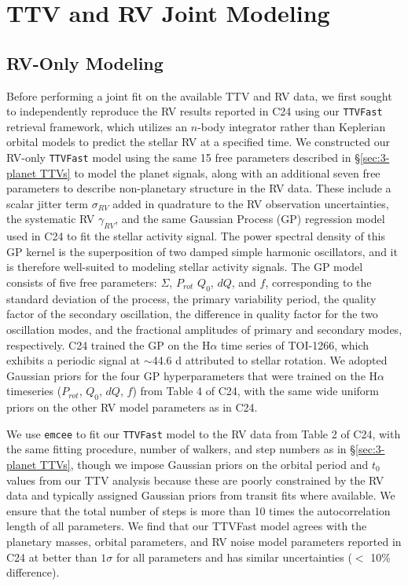 \documentclass[twocolumn]{aastex631}
\begin{document}
\section{TTV and RV Joint Modeling} \label{sec:joint modeling}

\subsection{RV-Only Modeling} \label{sec:RV Modeling}

Before performing a joint fit on the available TTV and RV data, we first sought to independently reproduce the RV results reported in C24 using our \texttt{TTVFast} retrieval framework, which utilizes an $n$-body integrator rather than Keplerian orbital models to predict the stellar RV at a specified time. We constructed our RV-only \texttt{TTVFast} model using the same 15 free parameters described in \S\ref{sec:3-planet TTVs} to model the planet signals, along with an additional seven free parameters to describe non-planetary structure in the RV data. These include a scalar jitter term $\sigma_{RV}$ added in quadrature to the RV observation uncertainties, the systematic RV $\gamma_{RV}$, and the same Gaussian Process (GP) regression model used in C24 to fit the stellar activity signal. The power spectral density of this GP kernel is the superposition of two damped simple harmonic oscillators, and it is therefore well-suited to modeling stellar activity signals. The GP model consists of five free parameters: $\Sigma$, $P_{rot}$ $Q_0$, $dQ$, and $f$, corresponding to the standard deviation of the process, the primary variability period, the quality factor of the secondary oscillation, the difference in quality factor for the two oscillation modes, and the fractional amplitudes of primary and secondary modes, respectively. C24 trained the GP on the H$\alpha$ time series of TOI-1266, which exhibits a periodic signal at $\sim$44.6 d attributed to stellar rotation. We adopted Gaussian priors for the four GP hyperparameters that were trained on the H$\alpha$ timeseries ($P_{rot}$, $Q_0$, $dQ$, $f$) from Table 4 of C24, with the same wide uniform priors on the other RV model parameters as in C24.

We use \texttt{emcee} to fit our \texttt{TTVFast} model to the RV data from Table 2 of C24, with the same fitting procedure, number of walkers, and step numbers as in \S\ref{sec:3-planet TTVs}, though we impose Gaussian priors on the orbital period and $t_0$ values from our TTV analysis because these are poorly constrained by the RV data and typically assigned Gaussian priors from transit fits where available. We ensure that the total number of steps is more than 10 times the autocorrelation length of all parameters. We find that our TTVFast model agrees with the planetary masses, orbital parameters, and RV noise model parameters reported in C24 at better than $1\sigma$ for all parameters and has similar uncertainties ($<$ 10\% difference). 
\end{document}
